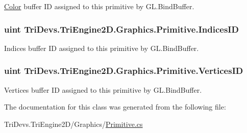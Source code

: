 \hyperlink{struct_tri_devs_1_1_tri_engine2_d_1_1_color}{Color} buffer I\-D assigned to this primitive by G\-L.\-Bind\-Buffer. 

\hypertarget{class_tri_devs_1_1_tri_engine2_d_1_1_graphics_1_1_primitive_a0856124fa599dbb34e44169c331094a2}{
\subsubsection[{Indices\-I\-D}]{\setlength{\rightskip}{0pt plus 5cm}uint Tri\-Devs.\-Tri\-Engine2\-D.\-Graphics.\-Primitive.\-Indices\-I\-D\hspace{0.3cm}{\ttfamily [get]}}}\label{class_tri_devs_1_1_tri_engine2_d_1_1_graphics_1_1_primitive_a0856124fa599dbb34e44169c331094a2}


Indices buffer I\-D assigned to this primitive by G\-L.\-Bind\-Buffer. 

\hypertarget{class_tri_devs_1_1_tri_engine2_d_1_1_graphics_1_1_primitive_acda37c3b5c83823f7299da2296a43cbd}{
\subsubsection[{Vertices\-I\-D}]{\setlength{\rightskip}{0pt plus 5cm}uint Tri\-Devs.\-Tri\-Engine2\-D.\-Graphics.\-Primitive.\-Vertices\-I\-D\hspace{0.3cm}{\ttfamily [get]}}}\label{class_tri_devs_1_1_tri_engine2_d_1_1_graphics_1_1_primitive_acda37c3b5c83823f7299da2296a43cbd}


Vertices buffer I\-D assigned to this primitive by G\-L.\-Bind\-Buffer. 



The documentation for this class was generated from the following file\-:\begin{DoxyCompactItemize}
\item 
Tri\-Devs.\-Tri\-Engine2\-D/\-Graphics/\hyperlink{_primitive_8cs}{Primitive.\-cs}\end{DoxyCompactItemize}

